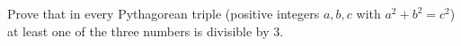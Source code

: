 Prove that in every Pythagorean triple (positive integers $a,b,c$ with $a^2+b^2=c^2$) at least one of the three numbers is divisible by $3$.

